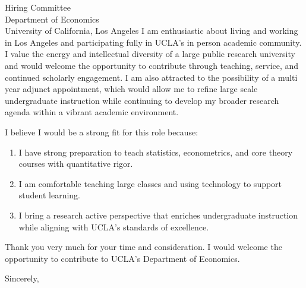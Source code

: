 \documentclass[11pt,letterpaper]{letter}
\begin{document}
\begin{letter}{
Hiring Committee \\
Department of Economics \\
University of California, Los Angeles
}
I am enthusiastic about living and working in Los Angeles and participating fully in UCLA’s in person academic community. I value the energy and intellectual diversity of a large public research university and would welcome the opportunity to contribute through teaching, service, and continued scholarly engagement. I am also attracted to the possibility of a multi year adjunct appointment, which would allow me to refine large scale undergraduate instruction while continuing to develop my broader research agenda within a vibrant academic environment.

I believe I would be a strong fit for this role because:
\begin{enumerate}
    \item I have strong preparation to teach statistics, econometrics, and core theory courses with quantitative rigor.
    \item I am comfortable teaching large classes and using technology to support student learning.
    \item I bring a research active perspective that enriches undergraduate instruction while aligning with UCLA’s standards of excellence.
\end{enumerate}

Thank you very much for your time and consideration. I would welcome the opportunity to contribute to UCLA’s Department of Economics.

\closing{Sincerely,}

\end{letter}
\end{document}
